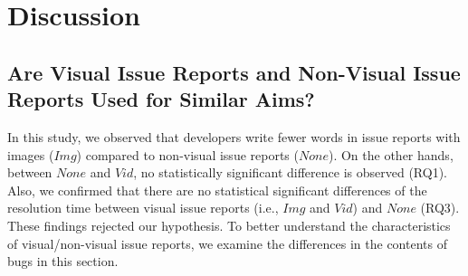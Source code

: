 \section{Discussion}



\subsection{Are Visual Issue Reports and Non-Visual Issue Reports Used for Similar Aims?}
In this study, we observed that developers write fewer words in issue reports with images ($Img$) compared to non-visual issue reports ($None$). On the other hands, between $None$ and $Vid$, no statistically significant difference is observed (RQ1). 
Also, we confirmed that there are no statistical significant differences of the resolution time between visual issue reports (i.e., $Img$ and $Vid$) and $None$ (RQ3). These findings rejected our hypothesis. 
To better understand the characteristics of visual/non-visual issue reports, we examine the differences in the contents of bugs in this section.

